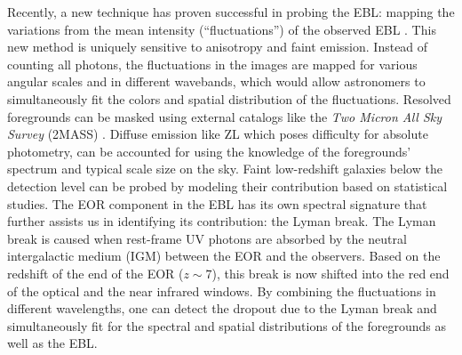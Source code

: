 
Recently, a new technique has proven successful in probing the EBL: mapping the variations from the mean intensity (``fluctuations'') of the observed EBL \citep{Cooray2004, Kashlinsky2005, Kashlinsky2007, Thompson2007, Matsumoto2011, ZemcovScience, Cooray2012}. This new method is uniquely sensitive to anisotropy and faint emission. Instead of counting all photons, the fluctuations in the images are mapped for various angular scales and in different wavebands, which would allow astronomers to simultaneously fit the colors and spatial distribution of the fluctuations. Resolved foregrounds can be masked using external catalogs like the \textit{Two Micron All Sky Survey} (2MASS) \citep{2MASS}. Diffuse emission like ZL which poses difficulty for absolute photometry, can be accounted for using the knowledge of the foregrounds' spectrum and typical scale size on the sky. Faint low-redshift galaxies below the detection level can be probed by modeling their contribution based on statistical studies. The EOR component in the EBL has its own spectral signature that further assists us in identifying its contribution: the Lyman break.
The Lyman break is caused when rest-frame UV photons are absorbed by the neutral intergalactic medium (IGM) between the EOR and the observers. Based on the redshift of the end of the EOR ($z \sim 7$), this break is now shifted into the red end of the optical and the near infrared windows. 
By combining the fluctuations in different wavelengths, one can detect the dropout due to the Lyman break and simultaneously fit for the spectral and spatial distributions of the foregrounds as well as the EBL.


